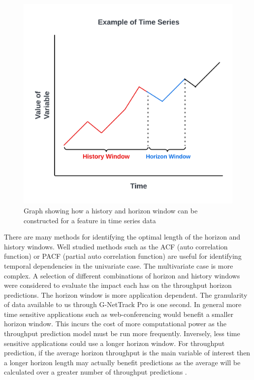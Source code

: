 \begin{figure}[h]
\includegraphics[scale=0.15]{History Horizon.png}
\centering
\caption{Graph showing how a history and horizon window can be constructed for a feature in time series data}
\label{fig:example_of_ts}
\end{figure}

There are many methods for identifying the optimal length of the horizon and history windows. Well studied methods such as the ACF (auto correlation function) or PACF (partial auto correlation function) \cite{10.2307/2958346} are useful for identifying temporal dependencies in the univariate case. The multivariate case is more complex. A selection of different combinations of horizon and history windows were considered to evaluate the impact each has on the throughput horizon predictions. The horizon window is more application dependent. The granularity of data available to us through G-NetTrack Pro is one second. In general more time sensitive applications such as web-conferencing would benefit a smaller horizon window. This incurs the cost of more computational power as the throughput prediction model must be run more frequently. Inversely, less time sensitive applications could use a longer horizon window. For throughput prediction, if the average horizon throughput is the main variable of interest then a longer horizon length may actually benefit predictions as the average will be calculated over a greater number of throughput predictions \cite{raca2019improving}.

